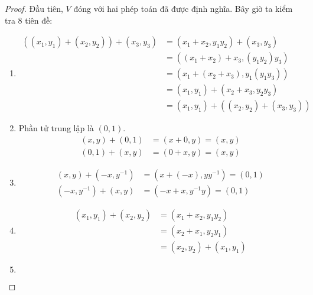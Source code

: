 \documentclass[class=linear-algebra,crop=false]{standalone}
\begin{document}
\begin{proof}Đầu tiên, $V$ đóng với hai phép toán đã được định nghĩa. Bây giờ ta kiểm tra 8 tiên đề:
    \begin{enumerate}[label = (V\arabic*)]
        \item
              \begin{align*}
                  ((x_{1}, y_{1}) + (x_{2}, y_{2})) + (x_{3}, y_{3}) & = (x_{1} + x_{2}, y_{1}y_{2}) + (x_{3}, y_{3})       \\
                                                                     & = ((x_{1} + x_{2}) + x_{3}, (y_{1}y_{2})y_{3})       \\
                                                                     & = (x_{1} + (x_{2} + x_{3}), y_{1}(y_{1}y_{3}))       \\
                                                                     & = (x_{1}, y_{1}) + (x_{2} + x_{3}, y_{2}y_{3})       \\
                                                                     & = (x_{1}, y_{1}) + ((x_{2}, y_{2}) + (x_{3}, y_{3}))
              \end{align*}
        \item Phần tử trung lập là $(0, 1)$.
              \begin{align*}
                  (x, y) + (0, 1) & = (x + 0, y) = (x, y) \\
                  (0, 1) + (x, y) & = (0 + x, y) = (x, y)
              \end{align*}
        \item
              \begin{align*}
                  (x, y) + (-x, y^{-1}) & = (x + (-x), yy^{-1}) = (0, 1) \\
                  (-x, y^{-1}) + (x, y) & = (-x + x, y^{-1}y) = (0, 1)
              \end{align*}
        \item
              \begin{align*}
                  (x_{1}, y_{1}) + (x_{2}, y_{2}) & = (x_{1} + x_{2}, y_{1}y_{2})     \\
                                                  & = (x_{2} + x_{1}, y_{2}y_{1})     \\
                                                  & = (x_{2}, y_{2}) + (x_{1}, y_{1})
              \end{align*}
        \item
              \begin{align*}

\end{align*}
\end{enumerate}
\end{proof}
\end{document}
